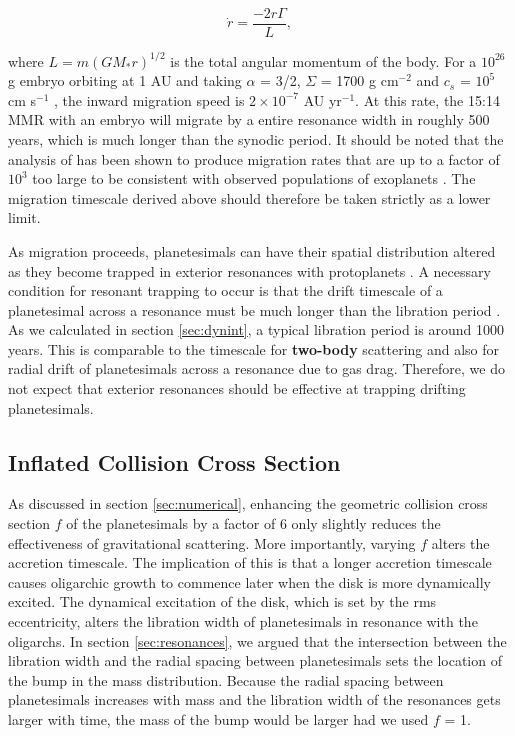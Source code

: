 \begin{equation}\label{eq:t1mig_rate}
    \dot{r} = \frac{-2 r \Gamma}{L},
\end{equation}

\noindent where $L = m \left( G M_{*} r \right)^{1/2}$ is the total angular momentum of the body. For a $10^{26}$ g embryo 
orbiting at 1 AU and taking $\alpha$ = 3/2, $\Sigma$ = 1700 g cm$^{-2}$ and $c_{s}$ = $10^{5}$ cm s$^{-1}$ \cite{hayashi81}, 
the inward migration speed is $2 \times 10^{-7}$ AU yr$^{-1}$. At this rate, the 15:14 MMR with an embryo will migrate by a 
entire resonance width in roughly 500 years, which is much longer than the synodic period. It should be noted that the analysis 
of \cite{tanaka02} has been shown to produce migration rates that are up to a factor of $10^{3}$ too large to be consistent with 
observed populations of exoplanets \cite{ida04, alibert05, miguel11}. The migration timescale derived above should therefore 
be taken strictly as a lower limit.

As migration proceeds, planetesimals can have their spatial distribution altered as they become trapped in exterior resonances 
with protoplanets \cite{weidenschilling85}. A necessary condition for resonant trapping to occur is that the drift timescale of a 
planetesimal across a resonance must be much longer than the libration period \cite{dermott88}. As we calculated in section 
\ref{sec:dynint}, a typical libration period is around 1000 years. This is comparable to the timescale for \textbf{two-body} 
scattering and also for radial drift of planetesimals across a resonance due to gas drag. Therefore, we do not expect that exterior 
resonances should be effective at trapping drifting planetesimals.

\subsection{Inflated Collision Cross Section}

As discussed in section \ref{sec:numerical}, enhancing the geometric collision cross section $f$ of the planetesimals by a factor 
of 6 only slightly reduces the effectiveness of gravitational scattering. More importantly, varying $f$ alters the accretion 
timescale. The implication of this is that a longer accretion timescale causes oligarchic growth to commence later when the disk 
is more dynamically excited. The dynamical excitation of the disk, which is set by the rms eccentricity, alters the libration width of 
planetesimals in resonance with the oligarchs. In section \ref{sec:resonances}, we argued that the intersection between the 
libration width and the radial spacing between planetesimals sets the location of the bump in the mass distribution. Because the 
radial spacing between planetesimals increases with mass and the libration width of the resonances gets larger with time, the 
mass of the bump would be larger had we used $f$ = 1.

